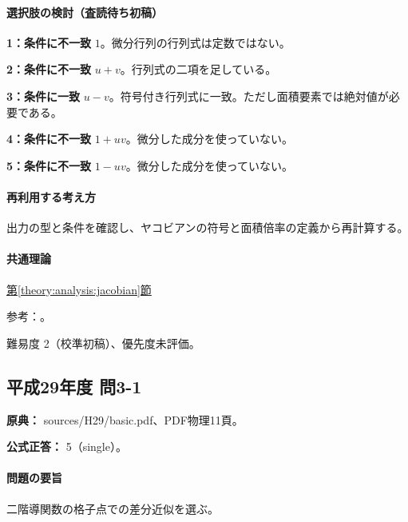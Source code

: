 \paragraph{選択肢の検討（査読待ち初稿）}\mbox{}\par

\noindent\textbf{1：条件に不一致} \(1\)。微分行列の行列式は定数ではない。\par

\noindent\textbf{2：条件に不一致} \(u+v\)。行列式の二項を足している。\par

\noindent\textbf{3：条件に一致} \(u-v\)。符号付き行列式に一致。ただし面積要素では絶対値が必要である。\par

\noindent\textbf{4：条件に不一致} \(1+uv\)。微分した成分を使っていない。\par

\noindent\textbf{5：条件に不一致} \(1-uv\)。微分した成分を使っていない。\par

\paragraph{再利用する考え方} 出力の型と条件を確認し、ヤコビアンの符号と面積倍率の定義から再計算する。

\paragraph{共通理論} \hyperref[theory:analysis:jacobian]{第\ref*{theory:analysis:jacobian}節}

\par 参考：\cite{mit_jacobian2007}。

\par 難易度 2（校準初稿）、優先度未評価。

\subsection{平成29年度 問3-1}
\label{q:h29-reg-basic-3-1}

\noindent\textbf{原典：} sources/H29/basic.pdf、PDF物理11頁。

\textbf{公式正答：} 5（single）。

\paragraph{問題の要旨} 二階導関数の格子点での差分近似を選ぶ。

